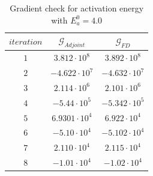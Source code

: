 \documentclass[12pt]{article}
\begin{document}
 \begin{table}[H]
		\caption{Gradient check for activation energy with $E_a^0=4.0$} %
		\centering  %
		\begin{tabular}{c c c } %
		\hline \hline                        %
		$iteration$&$\mathcal{G}_{Adjoint}$&$\mathcal{G}_{FD}$  \\ [0.5ex] %
		\hline                  %
		$1$ & $3.812 \cdot 10^{8}$ &$3.892\cdot 10^{8}$  \\
	 	$2$ & $-4.622\cdot 10^{7}$ &$-4.632\cdot 10^{7}$   \\
	        $3$ &$2.114 \cdot 10^{6}$ &$2.101\cdot 10^{6}$   \\
		$4$ &$-5.44\cdot 10^{5}$ &$-5.342\cdot 10^{5}$   \\
		$5$ &$6.9301 \cdot 10^{4}$ &$6.922\cdot 10^{4}$   \\
		$6$ &$-5.10 \cdot 10^{4}$ &$-5.102\cdot 10^{4}$ \\
		$7$ &$2.110 \cdot 10^{4}$ &$2.115\cdot 10^{4}$ \\
		$8$ &$-1.01 \cdot 10^{4}$ &$-1.02\cdot 10^{4}$ \\
                

                \hline %
		\end{tabular}
		\label{table:parameters} %
		\end{table}       
\end{document}
